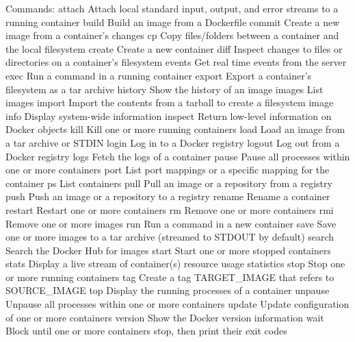 Commands:
  attach      Attach local standard input, output, and error streams to a running container
  build       Build an image from a Dockerfile
  commit      Create a new image from a container's changes
  cp          Copy files/folders between a container and the local filesystem
  create      Create a new container
  diff        Inspect changes to files or directories on a container's filesystem
  events      Get real time events from the server
  exec        Run a command in a running container
  export      Export a container's filesystem as a tar archive
  history     Show the history of an image
  images      List images
  import      Import the contents from a tarball to create a filesystem image
  info        Display system-wide information
  inspect     Return low-level information on Docker objects
  kill        Kill one or more running containers
  load        Load an image from a tar archive or STDIN
  login       Log in to a Docker registry
  logout      Log out from a Docker registry
  logs        Fetch the logs of a container
  pause       Pause all processes within one or more containers
  port        List port mappings or a specific mapping for the container
  ps          List containers
  pull        Pull an image or a repository from a registry
  push        Push an image or a repository to a registry
  rename      Rename a container
  restart     Restart one or more containers
  rm          Remove one or more containers
  rmi         Remove one or more images
  run         Run a command in a new container
  save        Save one or more images to a tar archive (streamed to STDOUT by default)
  search      Search the Docker Hub for images
  start       Start one or more stopped containers
  stats       Display a live stream of container(s) resource usage statistics
  stop        Stop one or more running containers
  tag         Create a tag TARGET_IMAGE that refers to SOURCE_IMAGE
  top         Display the running processes of a container
  unpause     Unpause all processes within one or more containers
  update      Update configuration of one or more containers
  version     Show the Docker version information
  wait        Block until one or more containers stop, then print their exit codes



\newpage